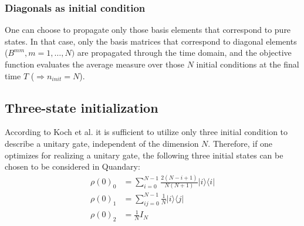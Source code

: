 \documentclass[11pt]{article}
\DeclareMathOperator{\Tr}{Tr}
\begin{document}
\subsubsection{Diagonals as initial condition}
One can choose to propagate only those basis elements that correspond to pure states. In that case, only the basis matrices that correspond
to diagonal elements ($B^{mm}, m=1,\dots,N)$ are propagated through the time
domain, and the objective function evaluates the average measure over those $N$
initial conditions at the final time $T$ ($\Rightarrow n_{init} = N$).


\subsection{Three-state initialization}
According to Koch et al. it is sufficient to utilize only three initial condition to describe a unitary gate, independent of the dimension $N$. Therefore, if one optimizes for realizing a unitary gate, the following three initial states can be chosen to be considered in Quandary:
\begin{align}
    \rho(0)_0 &= \sum_{i=0}^{N-1} \frac{2(N-i+1)}{N(N+1)} |i\rangle\langle i|\\
    \rho(0)_1 &= \sum_{ij=0}^{N-1} \frac{1}{N} |i\rangle\langle j|\\
    \rho(0)_2 &= \frac{1}{N} I_N
\end{align}
\end{document}
